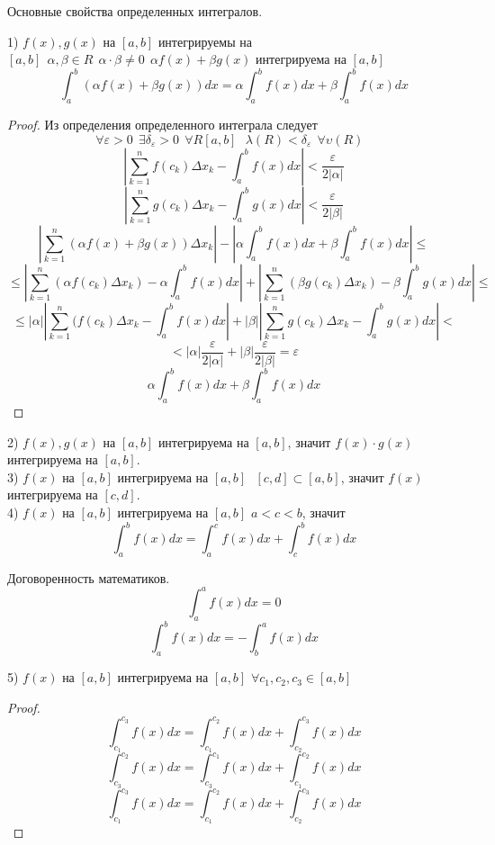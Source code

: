 \begin{title}[\Large]
    Основные свойства определенных интегралов.
\end{title}

1) $f(x), g(x)$ на $[a,b]$ интегрируемы на $[a,b] ~~ \alpha , \beta \in R ~~
\alpha \cdot \beta \not= 0 ~~ \alpha f(x) + \beta g(x)$ интегрируема на $[a,b]$
\[
    \int_a^b (\alpha f(x) + \beta g(x))dx = \alpha \int_a^b f(x)dx
    + \beta \int_a^b f(x)dx
\]

\begin{proof}
    Из определения определенного интеграла следует
    \[
        \forall\varepsilon>0 ~~ \exists\delta_{\varepsilon}>0 ~~ \forall R[a,b]
        ~~~ \lambda(R) < \delta_{\varepsilon} ~~ \forall\upsilon(R) ~~~
    \]
    \[
        \left| \sum_{k=1}^{n} f(c_k)\Delta x_k -
        \int_a^b f(x)dx \right| < \frac{\varepsilon}{2|\alpha|}
    \]
    \[
        \left| \sum_{k=1}^{n} g(c_k)\Delta x_k -
        \int_a^b g(x)dx \right| < \frac{\varepsilon}{2|\beta|}
    \]
    \[
        \left| \sum_{k=1}^{n} (\alpha f(x) + \beta g(x))\Delta x_k \right| -
        \left| \alpha \int_a^b f(x)dx + \beta \int_a^b f(x)dx \right| \le
    \]
    \[
      \le \left| \sum_{k=1}^{n} (\alpha f(c_k) \Delta x_k) -
      \alpha \int_a^b f(x)dx \right| + \left| \sum_{k=1}^{n} (\beta g(c_k)
      \Delta x_k) - \beta \int_a^b g(x)dx \right| \le
    \]
    \[
      \le |\alpha| \left| \sum_{k=1}^{n} (f(c_k) \Delta x_k -
      \int_a^b f(x)dx \right| + |\beta| \left| \sum_{k=1}^{n} g(c_k)
      \Delta x_k - \int_a^b g(x)dx \right| <
    \]
    \[
        < |\alpha| \frac{\varepsilon}{2|\alpha|} + |\beta|
        \frac{\varepsilon}{2|\beta|} = \varepsilon
    \]
    \[\alpha \int_a^b f(x)dx + \beta \int_a^b f(x)dx\]
\end{proof}

2) $f(x),g(x)$ на $[a,b]$ интегрируема на $[a,b]$, значит $f(x) \cdot g(x)$
интегрируема на $[a,b]$.\\
3) $f(x)$ на $[a,b]$ интегрируема на $[a,b] ~~~ [c,d] \subset [a,b]$, значит
$f(x)$ интегрируема на $[c,d]$.\\
4) $f(x)$ на $[a,b]$ интегрируема на $[a,b]$ $a < c < b$, значит
    \[\int_a^b f(x)dx = \int_a^c f(x)dx + \int_c^b f(x)dx\]

Договоренность математиков.
\[
    \int_a^a f(x)dx = 0
\]
\[
    \int_a^b f(x)dx = - \int_b^a f(x)dx
\]

5) $f(x)$ на $[a, b]$ интегрируема на $[a, b]$ $\forall c_1, c_2, c_3
                                                                \in [a, b]$\\
\begin{proof}
    \[
    \int_{c_1}^{c_3} f(x)dx = \int_{c_1}^{c_2} f(x)dx + \int_{c_2}^{c_3} f(x)dx
    \]
    \[
        \int_{c_3}^{c_2} f(x)dx = \int_{c_3}^{c_1}f(x)dx +
        \int_{c_1}^{c_2}f(x)dx
    \]
    \[
        \int_{c_1}^{c_3} f(x)dx = \int_{c_1}^{c_2}f(x)dx +
        \int_{c_2}^{c_3}f(x)dx
    \]
\end{proof}

